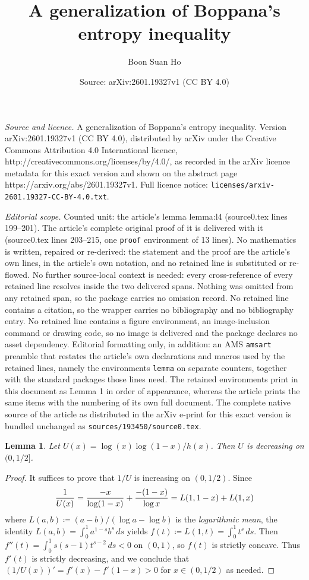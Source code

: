 \documentclass[10pt,a4paper]{amsart}
\title{A generalization of Boppana's entropy inequality}
\author{Boon Suan Ho}
\date{Source: arXiv:2601.19327v1 (CC BY 4.0)}
\newtheorem{lemma}{Lemma}
\begin{document}
\maketitle

\noindent\emph{Source and licence.} A generalization of Boppana's entropy inequality. Version arXiv:2601.19327v1 (CC BY 4.0), distributed by arXiv under the Creative Commons Attribution 4.0 International licence, http://creativecommons.org/licenses/by/4.0/, as recorded in the arXiv licence metadata for this exact version and shown on the abstract page https://arxiv.org/abs/2601.19327v1. Full licence notice: \texttt{licenses/arxiv-2601.19327-CC-BY-4.0.txt}.\par\smallskip

\noindent\textit{Editorial scope.} Counted unit: the article's lemma lemma:l4 (source0.tex lines 199--201). The article's complete original proof of it is delivered with it (source0.tex lines 203--215, one \texttt{proof} environment of 13 lines). No mathematics is written, repaired or re-derived: the statement and the proof are the article's own lines, in the article's own notation, and no retained line is substituted or re-flowed.  No further source-local context is needed: every cross-reference of every retained line resolves inside the two delivered spans.  Nothing was omitted from any retained span, so the package carries no omission record.  No retained line contains a citation, so the wrapper carries no bibliography and no bibliography entry.  No retained line contains a figure environment, an image-inclusion command or drawing code, so no image is delivered and the package declares no asset dependency.  Editorial formatting only, in addition: an AMS \texttt{amsart} preamble that restates the article's own declarations and macros used by the retained lines, namely the environments \texttt{lemma} on separate counters, together with the standard packages those lines need.  The retained environments print in this document as Lemma 1 in order of appearance, whereas the article prints the same items with the numbering of its own full document.  The complete native source of the article as distributed in the arXiv e-print for this exact version is bundled unchanged as \texttt{sources/193450/source0.tex}.
\begin{lemma} \label{lemma:l4}
Let $U(x)=\log(x)\log(1-x)/h(x)$. Then $U$ is decreasing on $(0,1/2]$.
\end{lemma}

\begin{proof}
It suffices to prove that $1/U$ is increasing on $(0,1/2)$.
Since \begin{equation}
{1\over U(x)}={-x\over\log(1-x)}+{-(1-x)\over\log x}=L(1,1-x)+L(1,x)
\end{equation}
where $L(a,b)\coloneqq(a-b)/(\log a-\log b)$ is the \emph{logarithmic mean},
the identity $L(a,b)=\int_0^1a^{1-s}b^s\,ds$ yields
$f(t)\coloneqq L(1,t)=\int_0^1t^s\,ds$. 
Then $f''(t)=\int_0^1s(s-1)t^{s-2}\,ds<0$ on $(0,1)$, 
so $f(t)$ is strictly concave.
Thus $f'(t)$ is strictly decreasing, and we conclude that 
$(1/U(x))'=f'(x)-f'(1-x)>0$ for $x\in(0,1/2)$ as needed.
\end{proof}
\end{document}
